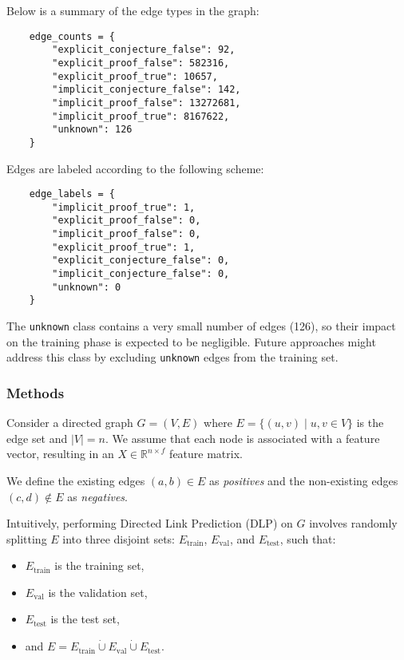 Below is a summary of the edge types in the graph:

\begin{verbatim}
    edge_counts = {
        "explicit_conjecture_false": 92,
        "explicit_proof_false": 582316,
        "explicit_proof_true": 10657,
        "implicit_conjecture_false": 142,
        "implicit_proof_false": 13272681,
        "implicit_proof_true": 8167622,
        "unknown": 126
    }
\end{verbatim}

Edges are labeled according to the following scheme:

\begin{verbatim}
    edge_labels = {
        "implicit_proof_true": 1,
        "explicit_proof_false": 0,
        "implicit_proof_false": 0,
        "explicit_proof_true": 1,
        "explicit_conjecture_false": 0,
        "implicit_conjecture_false": 0,
        "unknown": 0
    }
\end{verbatim}

The \texttt{unknown} class contains a very small number of edges (126), so their impact on the
training phase is expected to be negligible. Future approaches might address this class by
excluding \texttt{unknown} edges from the training set.

\subsubsection{Methods}

Consider a directed graph $G = (V, E)$ where $E = \{(u,v) \mid u, v \in V\}$ is the edge set and
$|V| = n$. We assume that each node is associated with a feature vector, resulting in an
$X \in \mathbb{R}^{n \times f}$ feature matrix.

We define the existing edges $(a, b) \in E$ as \emph{positives} and the non-existing edges
$(c, d) \notin E$ as \emph{negatives}.

Intuitively, performing Directed Link Prediction (DLP) on $G$ involves randomly splitting $E$
into three disjoint sets: $E_{\text{train}}$, $E_{\text{val}}$, and $E_{\text{test}}$, such that:

\begin{itemize}
    \item $E_{\text{train}}$ is the training set,
    \item $E_{\text{val}}$ is the validation set,
    \item $E_{\text{test}}$ is the test set,
    \item and $E = E_{\text{train}} \dot{\cup} E_{\text{val}} \dot{\cup} E_{\text{test}}$.
\end{itemize}


